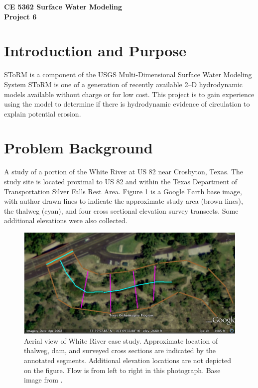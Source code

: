 \documentclass[12pt]{article}
\begin{document}
\begin{center}
{\textbf{{ CE 5362 Surface Water Modeling} \\ {Project 6}}}
\end{center}

\section*{{Introduction and Purpose}}
SToRM is a component of the USGS Multi-Dimensional Surface Water Modeling System \citep{mdswms2012}
SToRM is one of a generation of recently available 2--D hydrodynamic models available without charge or for low cost. 
This project is to gain experience using the model to determine if there is hydrodynamic evidence of circulation to explain potential erosion.


\section*{{Problem Background}}
A study of a portion of the White River at US 82 near Crosbyton, Texas.  
 The study site is located proximal to US 82 and within the Texas Department of Transportation Silver Falls Rest Area.  
 Figure \ref{fig:WhiteRiverAerial} is a Google Earth base image, with author drawn lines to indicate the approximate study area (brown lines), the thalweg (cyan), and four cross sectional elevation survey transects.   
Some additional elevations were also collected.  

\begin{figure}[h!] %
   \centering
   \includegraphics[width=6in]{WhiteRiverAerial.jpg} 
   \caption{Aerial view of White River case study.   Approximate location of thalweg, dam, and surveyed cross sections are indicated by the annotated segments.   Additional elevation locations are not depicted on the figure.  Flow is from left to right in this photograph.  Base image from \cite{GoogleEarth2011}.}
   \label{fig:WhiteRiverAerial}
\end{figure}
\clearpage
\end{document}
